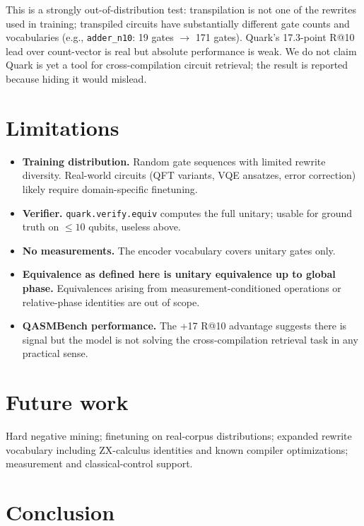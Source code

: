 \documentclass[11pt]{article}
\begin{document}
This is a strongly out-of-distribution test: transpilation is not one of the rewrites used in training; transpiled circuits have substantially different gate counts and vocabularies (e.g., \texttt{adder\_n10}: 19 gates $\rightarrow$ 171 gates). Quark's 17.3-point R@10 lead over count-vector is real but absolute performance is weak. We do not claim Quark is yet a tool for cross-compilation circuit retrieval; the result is reported because hiding it would mislead.

\section{Limitations}

\begin{itemize}[topsep=2pt,itemsep=2pt]
    \item \textbf{Training distribution.} Random gate sequences with limited rewrite diversity. Real-world circuits (QFT variants, VQE ansatzes, error correction) likely require domain-specific finetuning.
    \item \textbf{Verifier.} \texttt{quark.verify.equiv} computes the full unitary; usable for ground truth on $\leq 10$ qubits, useless above.
    \item \textbf{No measurements.} The encoder vocabulary covers unitary gates only.
    \item \textbf{Equivalence as defined here is unitary equivalence up to global phase.} Equivalences arising from measurement-conditioned operations or relative-phase identities are out of scope.
    \item \textbf{QASMBench performance.} The +17 R@10 advantage suggests there is signal but the model is not solving the cross-compilation retrieval task in any practical sense.
\end{itemize}

\section{Future work}

Hard negative mining; finetuning on real-corpus distributions; expanded rewrite vocabulary including ZX-calculus identities and known compiler optimizations; measurement and classical-control support.

\section{Conclusion}
\end{document}
